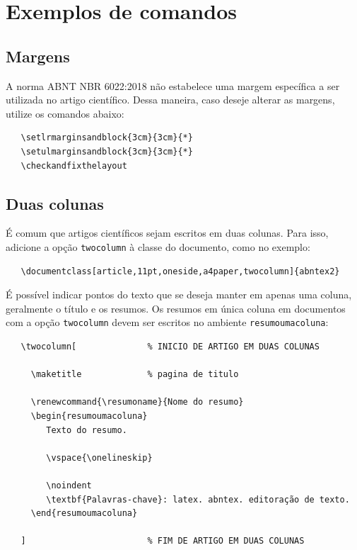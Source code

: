 \section{Exemplos de comandos}

\subsection{Margens}

A norma ABNT NBR 6022:2018 não estabelece uma margem específica a ser utilizada
no artigo científico. Dessa maneira, caso deseje alterar as margens, utilize os
comandos abaixo:

\begin{verbatim}
   \setlrmarginsandblock{3cm}{3cm}{*}
   \setulmarginsandblock{3cm}{3cm}{*}
   \checkandfixthelayout
\end{verbatim}

\subsection{Duas colunas}

É comum que artigos científicos sejam escritos em duas colunas. Para isso,
adicione a opção \texttt{twocolumn} à classe do documento, como no exemplo:

\begin{verbatim}
   \documentclass[article,11pt,oneside,a4paper,twocolumn]{abntex2}
\end{verbatim}

É possível indicar pontos do texto que se deseja manter em apenas uma coluna,
geralmente o título e os resumos. Os resumos em única coluna em documentos com
a opção \texttt{twocolumn} devem ser escritos no ambiente
\texttt{resumoumacoluna}:

\begin{verbatim}
   \twocolumn[              % INICIO DE ARTIGO EM DUAS COLUNAS

     \maketitle             % pagina de titulo

     \renewcommand{\resumoname}{Nome do resumo}
     \begin{resumoumacoluna}
        Texto do resumo.
      
        \vspace{\onelineskip}
 
        \noindent
        \textbf{Palavras-chave}: latex. abntex. editoração de texto.
     \end{resumoumacoluna}
   
   ]                        % FIM DE ARTIGO EM DUAS COLUNAS
\end{verbatim}

